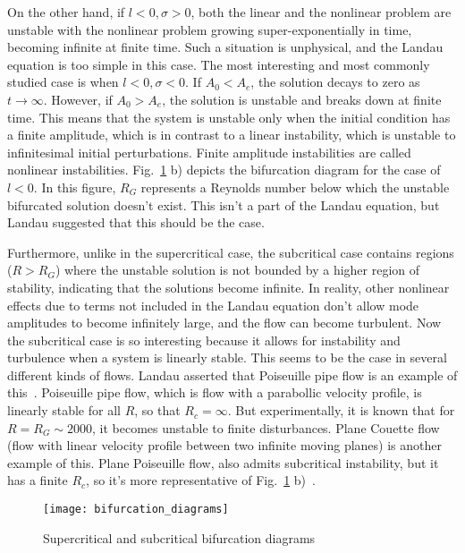 On the other hand, if $l<0, \sigma>0$, both the linear and the nonlinear problem are unstable with the nonlinear problem growing super-exponentially in time, becoming infinite at finite time.
Such a situation is unphysical, and the Landau equation is too simple in this case. The most interesting and most commonly studied case is when $l<0, \sigma<0$. If $A_0 < A_e$, the solution
decays to zero as $t \rightarrow \infty$. However, if $A_0 > A_e$, the solution is unstable and breaks down at finite time. This means that the system is unstable only when the initial
condition has a finite amplitude, which is in contrast to a linear instability, which is unstable to infinitesimal initial perturbations. Finite amplitude instabilities are called nonlinear
instabilities. Fig.~\ref{bifurcation_diagrams} b) depicts the bifurcation diagram
for the case of $l<0$. In this figure, $R_G$ represents a Reynolds number below which the unstable bifurcated solution doesn't exist. This isn't a part of the Landau equation, but Landau
suggested that this should be the case. 

Furthermore, unlike in the supercritical case, the subcritical case contains regions ($R>R_G$) where the unstable solution is not bounded by a higher
region of stability, indicating that the solutions become infinite. In reality, other nonlinear effects due to terms not included in the Landau equation don't allow mode amplitudes to become
infinitely large, and the flow can become turbulent. Now the subcritical case is so interesting because it allows for instability and turbulence when a system is linearly stable. This seems
to be the case in several different kinds of flows. Landau asserted that Poiseuille pipe flow is an example of this~\cite{landau1944}. 
Poiseuille pipe flow, which is flow with a parabollic velocity profile, is linearly stable for all $R$, so that $R_c = \infty$. 
But experimentally, it is known that for $R = R_G \sim 2000$, it becomes unstable to finite disturbances. Plane Couette flow (flow with linear velocity profile between two infinite moving planes)
is another example of this. Plane Poiseuille flow, also admits subcritical instability, but it has a finite $R_c$, so it's more representative of Fig.~\ref{bifurcation_diagrams} b)~\cite{trefethen1993}.

\begin{figure}[!ht]
\centerline{\texttt{[image: bifurcation\_diagrams]}}
\caption{Supercritical and subcritical bifurcation diagrams}
\label{bifurcation_diagrams}
\end{figure}


